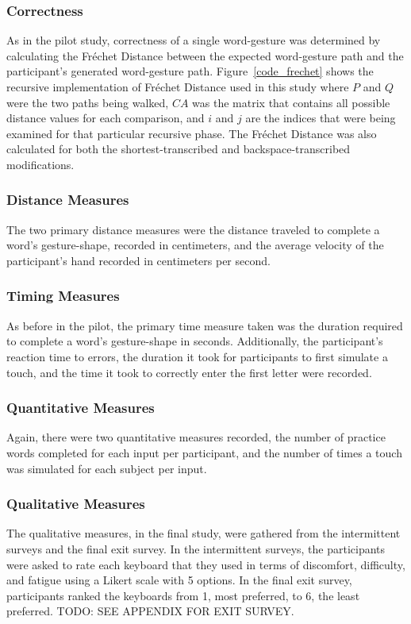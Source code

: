 \subsubsection{Correctness}
As in the pilot study, correctness of a single word-gesture was determined by calculating the Fr\'echet Distance between the expected word-gesture path and the participant's generated word-gesture path. Figure~\ref{code_frechet} shows the recursive implementation of Fr\'echet Distance used in this study where $P$ and $Q$ were the two paths being walked, $CA$ was the matrix that contains all possible distance values for each comparison, and $i$ and $j$ are the indices that were being examined for that particular recursive phase. The Fr\'echet Distance was also calculated for both the shortest-transcribed and backspace-transcribed modifications.

\subsubsection{Distance Measures}
The two primary distance measures were the distance traveled to complete a word's gesture-shape, recorded in centimeters, and the average velocity of the participant's hand recorded in centimeters per second.

\subsubsection{Timing Measures}
As before in the pilot, the primary time measure taken was the duration required to complete a word's gesture-shape in seconds. Additionally, the participant's reaction time to errors, the duration it took for participants to first simulate a touch, and the time it took to correctly enter the first letter were recorded.

\subsubsection{Quantitative Measures}
Again, there were two quantitative measures recorded, the number of practice words completed for each input per participant, and the number of times a touch was simulated for each subject per input.

\subsubsection{Qualitative Measures}
The qualitative measures, in the final study, were gathered from the intermittent surveys and the final exit survey. In the intermittent surveys, the participants were asked to rate each keyboard that they used in terms of discomfort, difficulty, and fatigue using a Likert scale with 5 options. In the final exit survey, participants ranked the keyboards from 1, most preferred, to 6, the least preferred. TODO: SEE APPENDIX FOR EXIT SURVEY. 
